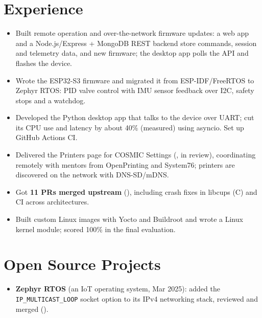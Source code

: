 \documentclass[10pt]{article}
\begin{document}
\section*{Experience}
\begin{itemize}
  \item Built remote operation and over-the-network firmware updates: a web app and a Node.js/Express + MongoDB REST backend store commands, session and telemetry data, and new firmware; the desktop app polls the API and flashes the device.
  \item Wrote the ESP32-S3 firmware and migrated it from ESP-IDF/FreeRTOS to Zephyr RTOS: PID valve control with IMU sensor feedback over I2C, safety stops and a watchdog.
  \item Developed the Python desktop app that talks to the device over UART; cut its CPU use and latency by about 40\% (measured) using asyncio. Set up GitHub Actions CI.
\end{itemize}
\begin{itemize}
  \item Delivered the Printers page for COSMIC Settings (, in review), coordinating remotely with mentors from OpenPrinting and System76; printers are discovered on the network with DNS-SD/mDNS.
  \item Got \textbf{11 PRs merged upstream} (), including crash fixes in libcups (C) and CI across architectures.
\end{itemize}
\begin{itemize}
  \item Built custom Linux images with Yocto and Buildroot and wrote a Linux kernel module; scored 100\% in the final evaluation.
\end{itemize}

\section*{Open Source Projects}
\begin{itemize}
  \item \textbf{Zephyr RTOS} (an IoT operating system, Mar 2025): added the \texttt{IP\_MULTICAST\_LOOP} socket option to its IPv4 networking stack, reviewed and merged ().
\end{itemize}
\end{document}
